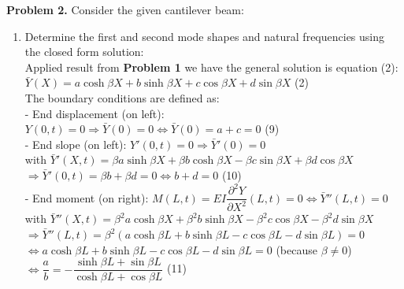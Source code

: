 \documentclass[14pt,a4paper]{article}
\begin{document}
\textbf{Problem 2.} Consider the given cantilever beam:
\begin{enumerate}
	\item Determine the first and second mode shapes and natural frequencies using the closed form solution:\\
	Applied result from \textbf{Problem 1} we have the general solution is equation (2):\\
	\hspace*{3cm}  $\bar{Y}(X) = a\cosh \beta X + b\sinh \beta X + c\cos \beta X + d\sin \beta X $ \hspace{2cm} (2)\\
	The boundary conditions are defined as:\\
	- End displacement (on left): $Y(0,t) = 0 \Rightarrow \bar{Y}(0) = 0 \Leftrightarrow \bar{Y}(0) = a + c = 0$ \hspace{2cm} (9)\\
	- End slope (on left): $Y'(0,t) = 0 \Rightarrow \bar{Y}'(0) = 0$\\
	\hspace*{1.6cm} with $ \bar{Y}'(X,t) = \beta a \sinh \beta X + \beta b \cosh \beta X - \beta c \sin \beta X + \beta d \cos \beta X $\\
	\hspace*{1.6cm} $\Rightarrow \bar{Y}'(0,t) = \beta b + \beta d = 0 \Leftrightarrow b + d = 0$ \hspace{5.8cm} (10) \\
	- End moment (on right): $ M(L,t) = EI\dfrac{\partial^2Y}{\partial X^2} (L,t) = 0 \Leftrightarrow \bar{Y}''(L,t) = 0$\\
	\hspace*{1.6cm} with $ \bar{Y}''(X,t) = \beta^2 a \cosh \beta X + \beta^2 b \sinh \beta X - \beta^2 c \cos \beta X - \beta^2 d \sin \beta X $\\
	\hspace*{1cm} $\Rightarrow \bar{Y}''(L,t) = \beta^2 \left(a \cosh \beta L + b \sinh \beta L - c \cos \beta L - d \sin \beta L \right) = 0 $\\
	\hspace*{2.7cm} $\Leftrightarrow a \cosh \beta L + b \sinh \beta L - c \cos \beta L - d \sin \beta L = 0 $ \hspace{1cm} (because $\beta \neq 0$) \\
	\hspace*{2.7cm} $ \Leftrightarrow \dfrac{a}{b} = -\dfrac{ \sinh\beta L + \sin \beta L}{\cosh \beta L + \cos \beta L} $ \hspace{6.5cm} (11)\\ 

\end{enumerate}
\end{document}

